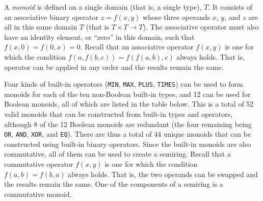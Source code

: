\documentclass[12pt]{article}
\begin{document}
A {\em monoid} is defined on a single domain (that is, a single type), $T$.  It
consists of an associative binary operator $z=f(x,y)$ whose three operands $x$,
$y$, and $z$ are all in this same domain $T$ (that is $T \times T \rightarrow
T$).  The associative operator must also have an identity element, or ``zero''
in this domain, such that $f(x,0)=f(0,x)=0$.  Recall that an associative
operator $f(x,y)$ is one for which the condition $f(a, f(b,c)) = f(f (a,b),c)$
always holds.  That is, operator can be applied in any order and the results
remain the same.

Four kinds of built-in operators (\verb'MIN', \verb'MAX', \verb'PLUS',
\verb'TIMES') can be used to form monoids for each of the ten non-Boolean
built-in types, and 12 can be used for Boolean monoids, all of which are listed
in the table below.  This is a total of 52 valid monoids that can be
constructed from built-in types and operators, although 8 of the 12 Boolean
monoids are redundant (the four remaining being \verb'OR', \verb'AND',
\verb'XOR', and \verb'EQ').  There are thus a total of 44 unique monoids that
can be constructed using built-in binary operators.  Since the built-in monoids
are also commutative, all of them can be used to create a semiring.  Recall
that a commutative operator $f(x,y)$ is one for which the condition
$f(a,b)=f(b,a)$ always holds.  That is, the two operands can be swapped and the
results remain the same.  One of the components of a semiring is a commutative
monoid.

\end{document}
